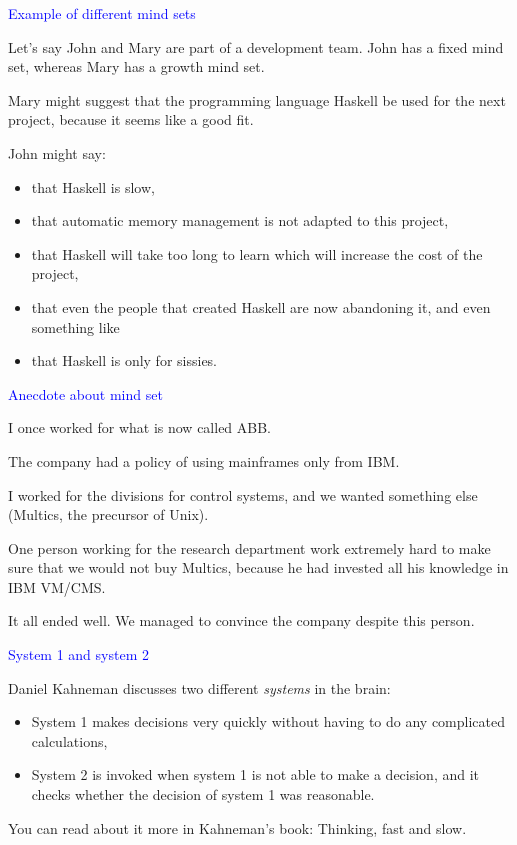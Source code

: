 \documentclass{slides}
\newcommand{\ti}[1]{\begin{center}\Large{\textcolor{blue}{#1}}\end{center}}
\begin{document}
\begin{slide}\ti{Example of different mind sets}

Let's say John and Mary are part of a development team.  John has a
fixed mind set, whereas Mary has a growth mind set.

Mary might suggest that the programming language Haskell be used for
the next project, because it seems like a good fit.

John might say:
\begin{itemize}
\item that Haskell is slow,
\item that automatic memory management is not adapted to this project,
\item that Haskell will take too long to learn which will increase the
  cost of the project,
\item that even the people that created Haskell are now abandoning it,
  and even something like
\item that Haskell is only for sissies.
\end{itemize}

\vfill\end{slide}
\begin{slide}\ti{Anecdote about mind set}

I once worked for what is now called ABB.

The company had a policy of using mainframes only from IBM.

I worked for the divisions for control systems, and we wanted
something else (Multics, the precursor of Unix).

One person working for the research department work extremely hard to
make sure that we would not buy Multics, because he had invested all
his knowledge in IBM VM/CMS.

It all ended well.  We managed to convince the company despite this
person.

\vfill\end{slide}
\begin{slide}\ti{System 1 and system 2}

Daniel Kahneman discusses two different \emph{systems} in the brain:

\begin{itemize}
\item System 1 makes decisions very quickly without having to do any
  complicated calculations,
\item System 2 is invoked when system 1 is not able to make a
  decision, and it checks whether the decision of system 1 was
  reasonable.
\end{itemize}

You can read about it more in Kahneman's book: Thinking, fast and
slow.

\vfill\end{slide}
\end{document}
